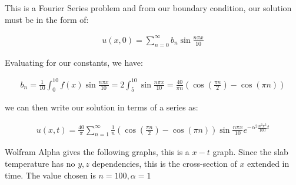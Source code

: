 \documentclass{article}
\numberwithin{equation}{section}
\begin{document}
This is a Fourier Series problem and from our boundary condition, our solution must be in the form of:

\begin{align}
    u(x,0) = \sum_{n=0}^{\infty} b_n \sin \frac{n \pi x}{10} 
\end{align}

Evaluating for our constants, we have:

\begin{align}
    b_n = \frac{1}{10}\int_{0}^{10} f(x) \sin \frac{n \pi x}{10} = 2 \int_{5}^{10} \sin \frac{n\pi x}{10} = \frac{40}{\pi n} ( \cos(\frac{\pi n}{2}) - \cos(\pi n))
\end{align}

we can then write our solution in terms of a series as:

\begin{align}
    u(x,t) = \frac{40}{\pi} \sum_{n=1}^{\infty} \frac{1}{n} ( \cos(\frac{\pi n}{2}) - \cos(\pi n)) \sin \frac{n\pi x}{10} e^{-\alpha^2 \frac{n^2\pi^2}{100}t}
\end{align}

Wolfram Alpha gives the following graphs, this is a $x-t$ graph. Since the slab temperature has no $y,z$ dependencies, this is the cross-section of $x$ extended in time. The value chosen is $n=100, \alpha = 1$
\end{document}
